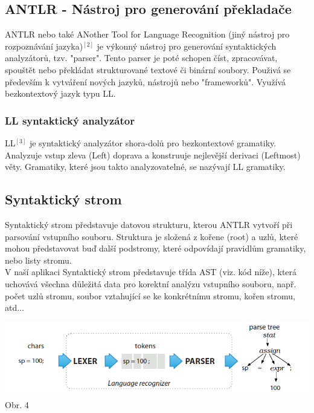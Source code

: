 \documentclass[czech,master,dept460,male,cpp,cpdeclaration]{diploma}
\begin{document}
\subsection{ANTLR - Nástroj pro generování překladače}
ANTLR nebo také ANother Tool for Language Recognition (jiný nástroj pro rozpoznávání jazyka)$^{[2]}$ je výkonný nástroj pro generování syntaktických analyzátorů, tzv. "parser". Tento parser je poté schopen číst, zpracovávat, spouštět nebo překládat strukturované textové či binární soubory. Použivá se především k vytváření nových jazyků, nástrojů nebo "frameworků". Využívá bezkontextový jazyk typu LL.
\subsubsection{LL syntaktický analyzátor}
LL$^{[3]}$ je syntaktický analyzátor shora-dolů pro bezkontextové gramatiky. Analyzuje vstup zleva (Left) doprava a konstruuje nejlevější derivaci (Leftmost) věty. Gramatiky, které jsou takto analyzovatelné, se nazývají LL gramatiky.

\subsection{Syntaktický strom}
Syntaktický strom představuje datovou strukturu, kterou ANTLR vytvoří při parsování vstupního souboru. Struktura je složená z kořene (root) a uzlů, které mohou představovat buď další podstromy, které odpovídají pravidlům gramatiky, nebo listy stromu.\\ 
V naší aplikaci Syntaktický strom představuje třída AST (viz. kód níže), která uchovává všechna důležitá data pro korektní analýzu vstupního souboru, např. počet uzlů stromu, soubor vztahující se ke konkrétnímu stromu, kořen stromu, atd...

\begin{center}
	\includegraphics[scale=0.7]{parser}
	\\
	Obr. 4
\end{center}
\end{document}
